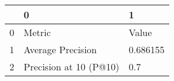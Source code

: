 \begin{tabular}{lll}
\toprule
{} &                       0 &         1 \\
\midrule
0 &                  Metric &     Value \\
1 &       Average Precision &  0.686155 \\
2 &  Precision at 10 (P@10) &       0.7 \\
\bottomrule
\end{tabular}
